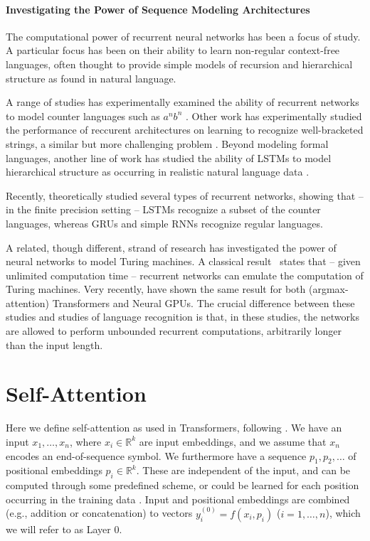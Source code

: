 \documentclass[11pt,a4paper]{article}
\begin{document}
\paragraph{Investigating the Power of Sequence Modeling Architectures}
The computational power of recurrent neural networks has been a focus of study.
A particular focus has been on their ability to learn non-regular context-free languages, often thought to provide simple models of recursion and hierarchical structure as found in natural language.

A range of studies has experimentally examined the ability of recurrent networks to model counter languages such as $a^nb^n$ \cite{kalinke1998computation,gers2001lstm,cartling2008implicit,weiss2018practical,suzgun2019evaluating}.
Other work has experimentally studied the performance of reccurent architectures on learning to recognize well-bracketed strings, a similar but more challenging problem \cite{sennhauser2018evaluating,skachkova2018closing,bernardy2018can}.
Beyond modeling formal languages, another line of work has studied the ability of LSTMs to model hierarchical structure as occurring in realistic natural language data \cite{linzen2016assessing,gulordava2018colorless}.

Recently, \citet{merrill2019sequential} theoretically studied several types of recurrent networks, showing that -- in the finite precision setting -- LSTMs recognize a subset of the counter languages, whereas GRUs and simple RNNs recognize regular languages.


A related, though different, strand of research has investigated the power of neural networks to model Turing machines.
A classical result~\cite{siegelman1991neural} states that -- given unlimited computation time -- recurrent networks can emulate the computation of Turing machines.
Very recently, \citet{perez2019turing} have shown the same result for both (argmax-attention) Transformers and Neural GPUs.
The crucial difference between these studies and studies of language recognition is that, in these studies, the networks are allowed to perform unbounded recurrent computations, arbitrarily longer than the input length.

\section{Self-Attention}\label{sec:def-selfatt}
Here we define self-attention as used in Transformers, following \citet{vaswani2017attention}.
We have an input $x_1,\dots,x_n$, where $x_i \in \mathbb{R}^k$ are input embeddings, and we assume that $x_n$ encodes an end-of-sequence symbol.
We furthermore have a sequence $p_1, p_2, \dots$ of positional embeddings $p_i \in \mathbb{R}^k$. These are independent of the input, and can be computed through some predefined scheme, or could be learned for each position occurring in the training data \citep{vaswani2017attention}.
Input and positional embeddings are combined (e.g., addition or concatenation) to vectors $y_i^{(0)} = f(x_i, p_i)$ ($i=1, \dots, n$), which we will refer to as Layer 0.
\end{document}
